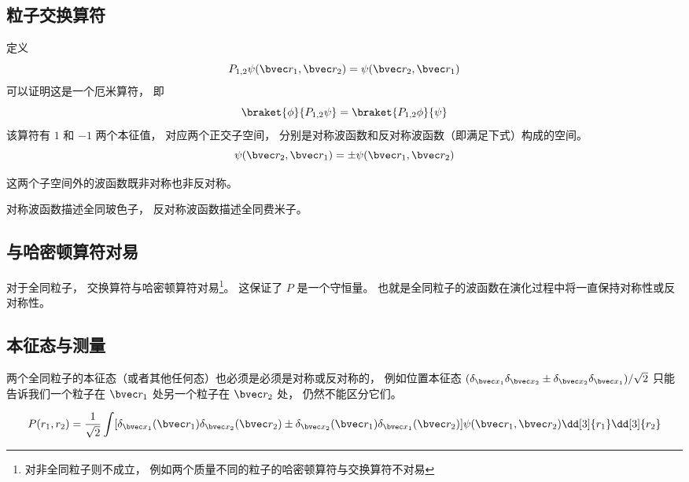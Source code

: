 

\subsection{粒子交换算符}

定义
\begin{equation}
P_{1,2}\psi(\bvec r_1, \bvec r_2) = \psi(\bvec r_2, \bvec r_1)
\end{equation}
可以证明这是一个厄米算符， 即
\begin{equation}
\braket{\phi}{P_{1,2}\psi} = \braket{P_{1,2}\phi}{\psi}
\end{equation}
该算符有 $1$ 和 $-1$ 两个本征值， 对应两个正交子空间， 分别是对称波函数和反对称波函数（即满足下式）构成的空间。
\begin{equation}
\psi(\bvec r_2, \bvec r_1) = \pm\psi(\bvec r_1, \bvec r_2)
\end{equation}

这两个子空间外的波函数既非对称也非反对称。

对称波函数描述全同玻色子， 反对称波函数描述全同费米子。

\subsection{与哈密顿算符对易}

对于全同粒子， 交换算符与哈密顿算符对易\footnote{对非全同粒子则不成立， 例如两个质量不同的粒子的哈密顿算符与交换算符不对易}。 这保证了 $P$ 是一个守恒量。 也就是全同粒子的波函数在演化过程中将一直保持对称性或反对称性。

\subsection{本征态与测量}
两个全同粒子的本征态（或者其他任何态）也必须是必须是对称或反对称的， 例如位置本征态 $(\delta_{\bvec x_1} \delta_{\bvec x_2}\pm \delta_{\bvec x_2} \delta_{\bvec x_1})/\sqrt 2$ 只能告诉我们一个粒子在 $\bvec r_1$ 处另一个粒子在 $\bvec r_2$ 处， 仍然不能区分它们。

\begin{equation}
P(r_1, r_2) = \frac{1}{\sqrt{2}}\int [\delta_{\bvec x_1}(\bvec r_1) \delta_{\bvec x_2}(\bvec r_2) \pm \delta_{\bvec x_2}(\bvec r_1) \delta_{\bvec x_1}(\bvec r_2)] \psi(\bvec r_1,\bvec r_2) \dd[3]{r_1}\dd[3]{r_2}
\end{equation}
